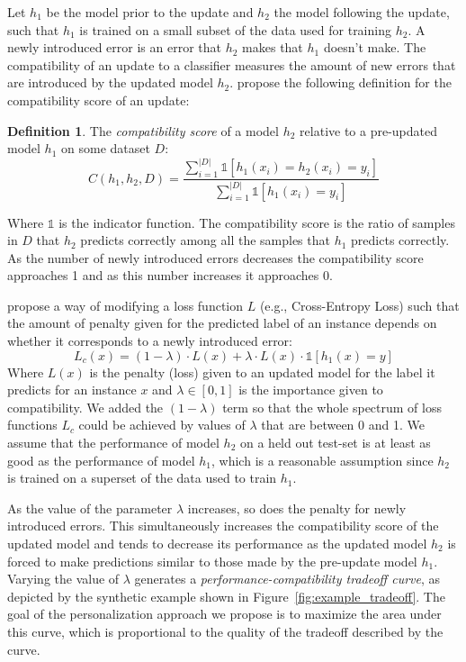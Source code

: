 \documentclass[letterpaper]{article}
\theoremstyle{definition}
\newtheorem{definition}{Definition}
\begin{document}
Let $h_1$ be the model prior to the update and $h_2$ the model following the update, such that $h_1$ is trained on a small subset of the data used for training $h_2$. A newly introduced error is an error that $h_2$ makes that $h_1$ doesn't make.
The compatibility of an update to a classifier measures the amount of new errors that are introduced by the updated model  $h_2$.
\citet{bansal2019updates} propose the following definition for the compatibility score of an update:
\begin{definition}{The \textit{compatibility score} of a model $h_2$ relative to a pre-updated  model $h_1$ on some dataset $D$:}
\begin{equation}
\label{eq:compatibility}
C(h_1,h_2,D)=\frac{\sum_{i=1}^{|D|}\mathbb{1}[h_1(x_i)=h_2(x_i)=y_i]}{\sum_{i=1}^{|D|}\mathbb{1}[h_1(x_i)=y_i]}
\end{equation}
\end{definition}
\noindent Where $\mathbb{1}$ is the indicator function. The compatibility score is the ratio of samples in $D$ that $h_2$ predicts correctly among all the samples that $h_1$ predicts correctly. As the number of  newly introduced errors decreases the compatibility score approaches 1 and as this number increases it approaches 0.

\citet{bansal2019updates} propose a way of modifying a loss function $L$ (e.g., Cross-Entropy Loss) such that the amount of penalty given for the predicted label of an instance depends on whether it corresponds to a newly introduced error:
\begin{equation}
\label{eqn:non-personalized_loss}
L_c(x)=(1 - \lambda) \cdot
L(x)+\lambda\cdot
L(x)\cdot\mathbb{1}[h_1(x)=y]
\end{equation}
Where $L(x)$ is the penalty (loss) given to an updated model for the label it predicts for an instance $x$ and $\lambda\in [0,1]$ is the importance given to compatibility. We added the $(1-\lambda)$ term so that the whole spectrum of loss functions $L_c$ could be achieved by values of $\lambda$ that are between 0 and 1. We assume that the performance of  model $h_2$  on a held out test-set is at least as good as the performance of model $h_1$, which is a reasonable assumption since $h_2$ is trained on a superset of the data used to train $h_1$.

As the value of the parameter $\lambda$ increases, so does the  penalty for newly introduced errors. This simultaneously increases the compatibility score of the updated model and tends to decrease its performance as the updated model $h_2$ is forced to make predictions similar to those made by the pre-update model $h_1$. Varying the value of $\lambda$ generates a \emph{performance-compatibility tradeoff curve}, as depicted by the synthetic example shown in Figure~\ref{fig:example_tradeoff}.  The goal of the personalization approach we propose is to maximize the area under this curve, which is proportional to the quality of the tradeoff described by the curve.
\end{document}
